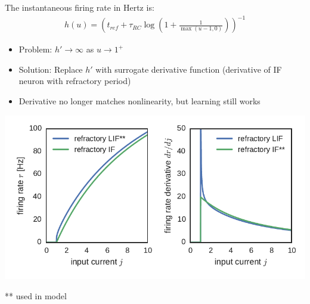 \documentclass[landscape,a0paper,fontscale=0.3]{baposter}
\newcommand{\compresslist}{%
\setlength{\itemsep}{1pt}%
\setlength{\parskip}{0pt}%
\setlength{\parsep}{0pt}%
\raggedright%
}
\begin{document}
\begin{poster}
{      The instantaneous firing rate in Hertz is:
      \begin{align}
        h(u) = \left(t_{ref} + \tau_{RC} \log\left(1 + \frac{1}{\max(u - 1, 0)}\right)\right)^{-1}
        \nonumber
      \end{align}

      \begin{itemize}
        \compresslist
        \item Problem: $h' \to \infty$ as $u \to 1^+$
        \item Solution: Replace $h'$ with surrogate derivative function
          (derivative of IF neuron with refractory period)
        \item Derivative no longer matches nonlinearity, but learning still works
      \end{itemize}

      \begin{center}
        \includegraphics[width=\columnwidth, clip=true, trim=3mm 6mm 3mm 4mm]
                        {figures/lifderivative.pdf}
      \end{center}

      \vspace{-1.5em}
      \begin{flushright}
        \scriptsize
        ** used in model
      \end{flushright}
    }


\end{poster}
\end{document}
